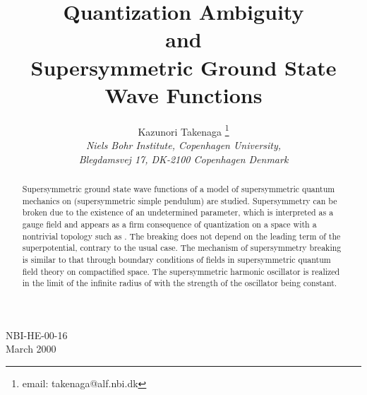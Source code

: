 \documentclass[a4paper,12pt]{article}
\begin{document}
\title{Quantization Ambiguity \\and \\
Supersymmetric Ground State Wave Functions}
\author{Kazunori Takenaga \vspace{1cm}\myHighlight{$^{}$}\coordHE{}\thanks {email: 
takenaga@alf.nbi.dk}\\ 
\it {Niels Bohr Institute, Copenhagen University,}\\ 
{\it Blegdamsvej 17, DK-2100 Copenhagen \myHighlight{$\emptyset$}\coordHE{} Denmark}}
\date{} %
\maketitle
\baselineskip=18pt
\vskip 3cm
\begin{abstract}
Supersymmetric ground state wave functions of 
a model of supersymmetric quantum mechanics on \coordHE{} (supersymmetric 
simple pendulum) are studied. Supersymmetry can be broken due to the 
existence of an undetermined parameter, which is interpreted 
as a gauge field and appears as 
a firm consequence of quantization on a space with 
a nontrivial topology such as \coordHE{}. The breaking does not depend on 
the leading term of the superpotential, contrary to the usual case.
The mechanism of supersymmetry breaking is similar to that through  
boundary conditions of fields in supersymmetric
quantum field theory on compactified space. 
The supersymmetric harmonic oscillator is 
realized in the limit of the infinite 
radius of \coordHE{} with the strength of the oscillator being constant.
\end{abstract}
\vskip 2cm
\begin{flushleft}
NBI-HE-00-16\\
March 2000\\
\end{flushleft}
\addtolength{\parindent}{2pt}
\newpage
\end{document}
